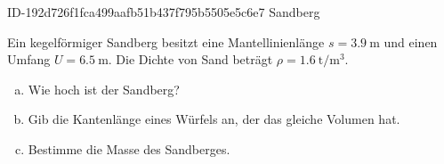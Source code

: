 \begin{exercise}
      {ID-192d726f1fca499aafb51b437f795b5505e5c6e7}
      {Sandberg}
  \ifproblem\problem\par
    Ein kegelförmiger Sandberg besitzt eine Mantellinienlänge
    $s=\SI{3.9}{\metre}$ und einen Umfang
    $U=\SI{6.5}{\metre}$.
    Die Dichte von Sand beträgt
    $\rho=\SI{1.6}{\tonne\per\cubic\metre}$.
    \begin{enumerate}[a)]
      \item Wie hoch ist der Sandberg?
      \item Gib die Kantenlänge eines Würfels an,
            der das gleiche Volumen hat.
      \item Bestimme die Masse des Sandberges.
    \end{enumerate}
  \fi
\end{exercise}
